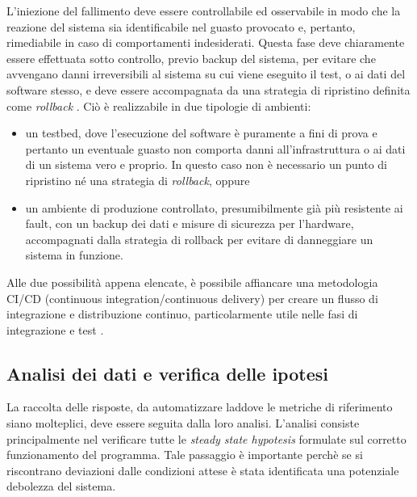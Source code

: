         
        L’iniezione del fallimento deve essere controllabile ed osservabile in modo che la reazione del sistema sia identificabile nel guasto provocato e, pertanto, rimediabile in caso di comportamenti indesiderati. Questa fase deve chiaramente essere effettuata sotto controllo, previo backup del sistema, per evitare che avvengano danni irreversibili al sistema su cui viene eseguito il test, o ai dati del software stesso, e deve essere accompagnata da una strategia di ripristino definita come \textit{rollback} \cite{miles}. Ciò è realizzabile in due tipologie di ambienti:  
        \begin{itemize}
            \item un testbed, dove l'esecuzione del software è puramente a fini di prova e pertanto un eventuale guasto non comporta danni all’infrastruttura o ai dati di un sistema vero e proprio. In questo caso non è necessario un punto di ripristino né una strategia di \textit{rollback}, oppure 
            \item un ambiente di produzione controllato, presumibilmente già più resistente ai fault, con un backup dei dati e misure di sicurezza per l’hardware, accompagnati dalla strategia di rollback per evitare di danneggiare un sistema in funzione.
        \end{itemize}
        Alle due possibilità appena elencate, è possibile affiancare una metodologia CI/CD (continuous integration/continuous delivery) per creare un flusso di integrazione e distribuzione continuo, particolarmente utile nelle fasi di integrazione e test \cite{cicd}.
        \subsection{Analisi dei dati e verifica delle ipotesi}
        La raccolta delle risposte, da automatizzare laddove le metriche di riferimento siano molteplici, deve essere seguita dalla loro analisi. L'analisi consiste principalmente nel verificare tutte le \textit{steady state hypotesis} formulate sul corretto funzionamento del programma. Tale passaggio è importante perchè se si riscontrano deviazioni dalle condizioni attese è stata identificata una potenziale debolezza del sistema.
        
